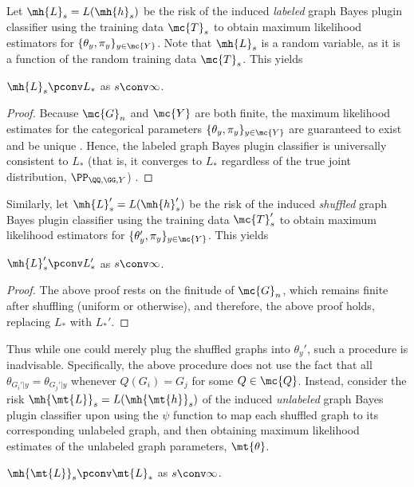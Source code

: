 \documentclass[10pt,journal,cspaper,compsoc]{IEEEtran}
\begin{document}
Let $\mh{L}_s=L(\mh{h}_s)$ be the risk of the induced \emph{labeled} graph Bayes plugin classifier using the training data $\mc{T}_s$ to obtain maximum likelihood estimators for $\{\theta_y,\pi_y\}_{y \in \mc{Y}}$. Note that $\mh{L}_s$ is a random variable, as it is a function of the random training data $\mc{T}_s$. This yields
\begin{thm} \label{thm:4}
	$\mh{L}_s \pconv L_*$ as $s \conv \infty$.
\end{thm}
\begin{proof}
Because ${\mc{G}}_n$ and $\mc{Y}$ are both finite, the maximum likelihood estimates for the categorical parameters $\{\theta_y,\pi_y\}_{y \in \mc{Y}}$ are guaranteed to exist and be unique \cite{Devroye1996}.  Hence, the labeled graph Bayes plugin classifier is universally consistent to ${L}_*$ (that is, it converges to ${L}_*$ regardless of the true joint distribution, $\PP_{\QQ, \GG ,Y}$) \cite{Devroye1996}. 
\end{proof}

Similarly, let $\mh{L}_s'=L(\mh{h}_s')$ be the risk of the induced \emph{shuffled} graph Bayes plugin classifier using the training data $\mc{T}_s'$ to obtain maximum likelihood estimators for $\{\theta_y',\pi_y\}_{y \in \mc{Y}}$.  This yields
\begin{coro} \label{cor:Sh_Plug}
	$\mh{L}_s' \pconv L_*'$ as $s \conv \infty$.
\end{coro}
\begin{proof}
	The above proof rests on the finitude of $\mc{G}_n$, which remains finite after shuffling (uniform or otherwise), and therefore, the above proof holds, replacing $L_*$ with $L_*'$.
\end{proof}



Thus while one could merely plug the shuffled graphs into $\theta_y'$, such a procedure is inadvisable.  Specifically, the above procedure does not  use the fact that all $\theta_{G_i'|y} = \theta_{G_j'|y}$ whenever $Q(G_i)=G_j$ for some $Q \in \mc{Q}$.  Instead, consider the risk $\mh{\mt{L}}_s=L(\mh{\mt{h}}_s)$ of the induced \emph{unlabeled} graph Bayes plugin classifier upon using the $\psi$ function to map each shuffled graph to its corresponding unlabeled graph, and then obtaining maximum likelihood estimates of the unlabeled graph parameters, $\mt{\theta}$.  
\begin{coro} \label{cor:Un_Plug}
	$\mh{\mt{L}}_s \pconv \mt{L}_*$ as $s \conv \infty$.
\end{coro}
\end{document}
